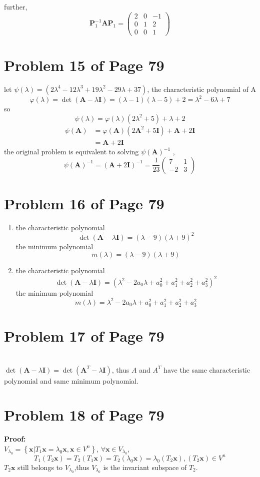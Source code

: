 \documentclass[12pt,a4paper]{article}
\newcommand{\mysection}[2]{
\section{Problem #1 of Page #2}	
	}
\begin{document}
further,
\[
\bm{P}_1^{-1}\bm{AP}_1 = \left( \begin{array}{ccc}
2 &    0 &   -1 \\
0 &    1 &    2 \\
0 &    0 &    1
\end{array}  
\right) 
\]
\mysection{15}{79}
let $\psi(\lambda) = (2\lambda^{4} - 12\lambda^{3} + 19 \lambda^{2} - 29\lambda + 37)$,
the characteristic polynomial of A \\
\[
\varphi(\lambda) = \det(\bm{A} - \lambda\bm{I}) = (\lambda - 1)(\lambda - 5) + 2 
= \lambda^{2} - 6\lambda + 7
\]
so 
\[
\psi(\lambda) = \varphi(\lambda)(2\lambda^{2} + 5) + \lambda + 2
\] 
\[
\begin{split}
\psi(\bm{A}) &= \varphi(\bm{A})(2\bm{A}^{2} + 5\bm{I}) + \bm{A} + 2\bm{I} \\
&= \bm{A} + 2\bm{I}
\end{split} 
\] 
the original problem is equivalent to  solving ${\psi(\bm{A})}^{-1} $ ,
\[
\psi(\bm{A})^{-1} = (\bm{A}+2\bm{I})^{-1} = \frac{1}{23}\left( \begin{array}{cc}
7 & 1 \\
-2 & 3
\end{array} 
\right) 
\]
\mysection{16}{79}
\begin{enumerate}[(1)]
	\item the characteristic polynomial 
	\[
		\det(\bm{A} - \lambda\bm{I}) = (\lambda - 9)(\lambda + 9)^{2}
	\]
	the minimum polynomial 
	\[
	m(\lambda) = (\lambda - 9)(\lambda + 9)  
	\]
	\item the characteristic polynomial 
	\[
	\det(\bm{A} - \lambda\bm{I}) = (\lambda^2- 2a_0\lambda + a_0^2 + a_1^2 + a_2^2 + a_3^2)^2
	\]
	the minimum polynomial 
	\[
	m(\lambda) = \lambda^2- 2a_0\lambda + a_0^2 + a_1^2 + a_2^2 + a_3^2
	\]
\end{enumerate}

\mysection{17}{79}
 \\
\indent $\det(\bm{A} - \lambda\bm{I}) = \det(\bm{A}^{T} - \lambda \bm{I})$,
thus $A$ and $A^{T}$ have the same characteristic polynomial
and same minimum polynomial.
\mysection{18}{79}
\textbf{Proof:}  \\
\indent $V_{\lambda_0} = \left\lbrace \bm{x} | T_1\bm{x} = \lambda_0\bm{x},\bm{x} \in V^{n} \right\rbrace$,
$\forall \bm{x} \in V_{\lambda_0}$, 
\[
T_1(T_2\bm{x}) = T_2(T_1\bm{x}) = T_2(\lambda_0 \bm{x}) = \lambda_0 (T_2\bm{x}),(T_2\bm{x})\in V^{n}
\]
$T_2\bm{x}$ still belongs to $V_{\lambda_0}$,thus $V_{\lambda_0}$ is the invariant subspace of $T_2$.
\end{document}
